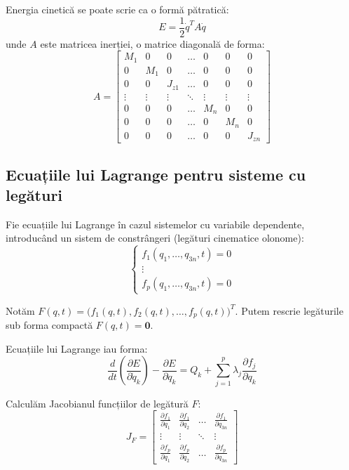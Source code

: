 \documentclass[12pt, a4paper]{article}
\begin{document}
Energia cinetică se poate scrie ca o formă pătratică:
\begin{equation}
    E = \frac{1}{2}\dot{q}^T A \dot{q}
\end{equation}
unde $A$ este matricea inerției, o matrice diagonală de forma:
\begin{equation}
    A = \begin{bmatrix}
        M_1 & 0 & 0 & \dots & 0 & 0 & 0 \\  
        0 & M_1 & 0 & \dots & 0 & 0 & 0 \\
        0 & 0 & J_{z1} & \dots & 0 & 0 & 0 \\
        \vdots & \vdots & \vdots & \ddots & \vdots & \vdots & \vdots \\
        0 & 0 & 0 & \dots & M_n & 0 & 0 \\
        0 & 0 & 0 & \dots & 0 & M_n & 0 \\
        0 & 0 & 0 & \dots & 0 & 0 & J_{zn}
    \end{bmatrix}
\end{equation}

\subsection{Ecuațiile lui Lagrange pentru sisteme cu legături}

Fie ecuațiile lui Lagrange în cazul sistemelor cu variabile dependente, introducând un sistem de constrângeri (legături cinematice olonome):
\begin{equation}
    \begin{cases}
        f_1(q_1, \dots, q_{3n}, t) = 0 \\
        \vdots \\
        f_p(q_1, \dots, q_{3n}, t) = 0
    \end{cases}
\end{equation}

Notăm $F(q,t) = \big( f_1(q,t), f_2(q,t), \dots, f_p(q,t) \big)^T$. 
Putem rescrie legăturile sub forma compactă $F(q,t) = \mathbf{0}$.

Ecuațiile lui Lagrange iau forma:
\begin{equation}
    \frac{d}{dt}\left(\frac{\partial E}{\partial \dot{q}_k}\right) - \frac{\partial E}{\partial q_k} = Q_k + \sum_{j=1}^{p} \lambda_j \frac{\partial f_j}{\partial q_k} 
\end{equation}

Calculăm Jacobianul funcțiilor de legătură $F$:
\begin{equation}
    J_F = \begin{bmatrix}
        \frac{\partial f_1}{\partial q_1} & \frac{\partial f_1}{\partial q_2} & \dots & \frac{\partial f_1}{\partial q_{3n}} \\
        \vdots & \vdots & \ddots & \vdots \\
        \frac{\partial f_p}{\partial q_1} & \frac{\partial f_p}{\partial q_2} & \dots & \frac{\partial f_p}{\partial q_{3n}}
    \end{bmatrix}
\end{equation}
\end{document}
